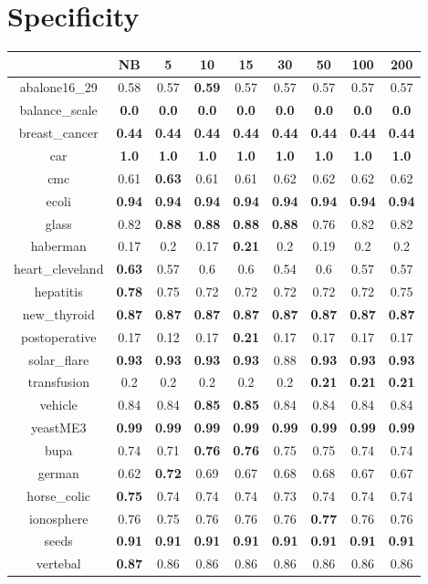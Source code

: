 \documentclass{article}%
\begin{document}
%
\section*{Specificity}%
\begin{tabular}{c|cccccccc}%
\hline%
&NB&5&10&15&30&50&100&200\\%
\hline%
abalone16\_29&0.58&0.57&\textbf{0.59}&0.57&0.57&0.57&0.57&0.57\\%
\hline%
balance\_scale&\textbf{0.0}&\textbf{0.0}&\textbf{0.0}&\textbf{0.0}&\textbf{0.0}&\textbf{0.0}&\textbf{0.0}&\textbf{0.0}\\%
\hline%
breast\_cancer&\textbf{0.44}&\textbf{0.44}&\textbf{0.44}&\textbf{0.44}&\textbf{0.44}&\textbf{0.44}&\textbf{0.44}&\textbf{0.44}\\%
\hline%
car&\textbf{1.0}&\textbf{1.0}&\textbf{1.0}&\textbf{1.0}&\textbf{1.0}&\textbf{1.0}&\textbf{1.0}&\textbf{1.0}\\%
\hline%
cmc&0.61&\textbf{0.63}&0.61&0.61&0.62&0.62&0.62&0.62\\%
\hline%
ecoli&\textbf{0.94}&\textbf{0.94}&\textbf{0.94}&\textbf{0.94}&\textbf{0.94}&\textbf{0.94}&\textbf{0.94}&\textbf{0.94}\\%
\hline%
glass&0.82&\textbf{0.88}&\textbf{0.88}&\textbf{0.88}&\textbf{0.88}&0.76&0.82&0.82\\%
\hline%
haberman&0.17&0.2&0.17&\textbf{0.21}&0.2&0.19&0.2&0.2\\%
\hline%
heart\_cleveland&\textbf{0.63}&0.57&0.6&0.6&0.54&0.6&0.57&0.57\\%
\hline%
hepatitis&\textbf{0.78}&0.75&0.72&0.72&0.72&0.72&0.72&0.75\\%
\hline%
new\_thyroid&\textbf{0.87}&\textbf{0.87}&\textbf{0.87}&\textbf{0.87}&\textbf{0.87}&\textbf{0.87}&\textbf{0.87}&\textbf{0.87}\\%
\hline%
postoperative&0.17&0.12&0.17&\textbf{0.21}&0.17&0.17&0.17&0.17\\%
\hline%
solar\_flare&\textbf{0.93}&\textbf{0.93}&\textbf{0.93}&\textbf{0.93}&0.88&\textbf{0.93}&\textbf{0.93}&\textbf{0.93}\\%
\hline%
transfusion&0.2&0.2&0.2&0.2&0.2&\textbf{0.21}&\textbf{0.21}&\textbf{0.21}\\%
\hline%
vehicle&0.84&0.84&\textbf{0.85}&\textbf{0.85}&0.84&0.84&0.84&0.84\\%
\hline%
yeastME3&\textbf{0.99}&\textbf{0.99}&\textbf{0.99}&\textbf{0.99}&\textbf{0.99}&\textbf{0.99}&\textbf{0.99}&\textbf{0.99}\\%
\hline%
bupa&0.74&0.71&\textbf{0.76}&\textbf{0.76}&0.75&0.75&0.74&0.74\\%
\hline%
german&0.62&\textbf{0.72}&0.69&0.67&0.68&0.68&0.67&0.67\\%
\hline%
horse\_colic&\textbf{0.75}&0.74&0.74&0.74&0.73&0.74&0.74&0.74\\%
\hline%
ionosphere&0.76&0.75&0.76&0.76&0.76&\textbf{0.77}&0.76&0.76\\%
\hline%
seeds&\textbf{0.91}&\textbf{0.91}&\textbf{0.91}&\textbf{0.91}&\textbf{0.91}&\textbf{0.91}&\textbf{0.91}&\textbf{0.91}\\%
\hline%
vertebal&\textbf{0.87}&0.86&0.86&0.86&0.86&0.86&0.86&0.86\\%
\hline%
\end{tabular}
\end{document}
